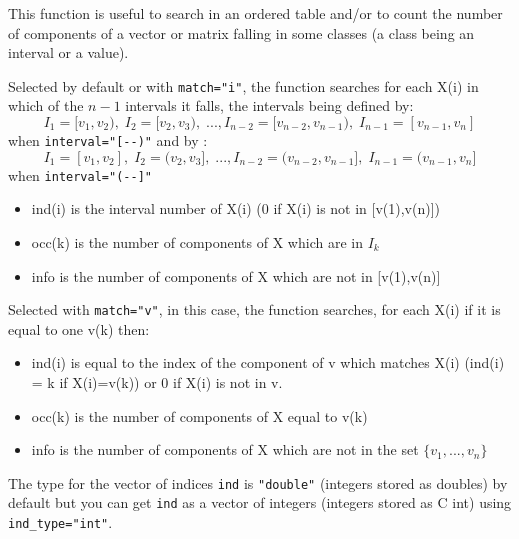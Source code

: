 \begin{mandescription}
This function is useful to search in an ordered table and/or to count the number of components
of a vector or matrix falling in some classes (a class being an interval or a value).

Selected by default or with  \verb+match="i"+, the function searches for each
X(i) in which of the $n-1$ intervals it falls, the intervals being defined by:
$$
   I_1 = [v_1, v_2), \;I_2 = [v_2, v_3),\;...,I_{n-2} = [v_{n-2},
   v_{n-1}),\; I_{n-1} = [v_{n-1}, v_n] 
$$
when \verb+interval="[--)"+ and by :
$$
   I_1 = [v_1, v_2], \;I_2 = (v_2, v_3],\;...,I_{n-2} = (v_{n-2},
   v_{n-1}],\; I_{n-1} = (v_{n-1}, v_n] 
$$
when \verb+interval="(--]"+
\begin{itemize}
   \item ind(i) is the interval number of X(i) (0 if X(i) is not in [v(1),v(n)])
   \item occ(k)  is the number of components of X which are in $I_k$
   \item info is the number of components of X which are not in [v(1),v(n)] 
\end{itemize}

Selected with  \verb+match="v"+, in this case, the function searches,
for each X(i) if it is equal to one v(k) then:
\begin{itemize}
   \item ind(i) is equal to the index of the component of v which matches X(i) 
                   (ind(i) = k if X(i)=v(k)) or 0 if X(i) is not in v.
   \item occ(k) is the number of components of X equal to v(k)
   \item info is the number of components of X which are not in the set $\{v_1,...,v_n\}$ 
\end{itemize}

The type for the vector of indices \verb+ind+ is \verb+"double"+ (integers stored as
doubles) by default but you can get \verb+ind+ as a vector of integers (integers stored as
C int) using \verb+ind_type="int"+.

\end{mandescription}

